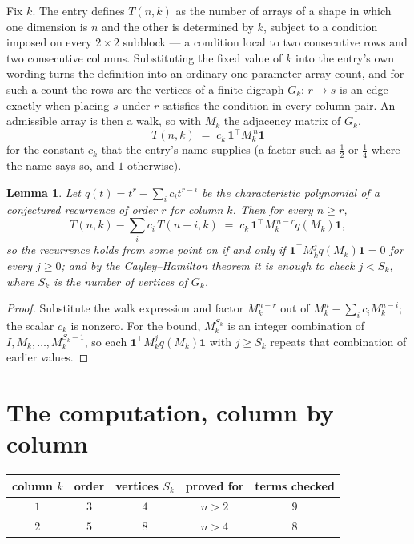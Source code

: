\documentclass[11pt,a4paper]{article}
\theoremstyle{plain}
\newtheorem{lemma}[theorem]{Lemma}
\theoremstyle{definition}
\begin{document}
Fix $k$. The entry defines $T(n,k)$ as the number of arrays of a shape in which one dimension
is $n$ and the other is determined by $k$, subject to a condition imposed on every
$2\times2$ subblock --- a condition local to two consecutive rows and two consecutive columns.
Substituting the fixed value of $k$ into the entry's own wording turns the definition into an
ordinary one-parameter array count, and for such a count the rows are the vertices of a finite
digraph $G_k$: $r\to s$ is an edge exactly when placing $s$ under $r$ satisfies the condition
in every column pair. An admissible array is then a walk, so with $M_k$ the adjacency matrix
of $G_k$,
\[
T(n,k)\;=\;c_k\,\mathbf{1}^{\!\top}M_k^{\,n}\mathbf{1}
\]
for the constant $c_k$ that the entry's name supplies (a factor such as $\tfrac12$ or
$\tfrac14$ where the name says so, and $1$ otherwise).

\begin{lemma}\label{lem:crit}
Let $q(t)=t^{r}-\sum_i c_it^{r-i}$ be the characteristic polynomial of a conjectured
recurrence of order $r$ for column $k$. Then for every $n\ge r$,
\[
T(n,k)-\sum_i c_i\,T(n-i,k)\;=\;c_k\,\mathbf{1}^{\!\top}M_k^{\,n-r}q(M_k)\mathbf{1},
\]
so the recurrence holds from some point on if and only if
$\mathbf{1}^{\!\top}M_k^{j}q(M_k)\mathbf{1}=0$ for every $j\ge0$; and by the
Cayley--Hamilton theorem it is enough to check $j<S_k$, where $S_k$ is the number of vertices
of $G_k$.
\end{lemma}

\begin{proof}
Substitute the walk expression and factor $M_k^{n-r}$ out of $M_k^{n}-\sum_ic_iM_k^{n-i}$;
the scalar $c_k$ is nonzero. For the bound, $M_k^{S_k}$ is an integer combination of
$I,M_k,\dots,M_k^{S_k-1}$, so each $\mathbf{1}^{\!\top}M_k^{j}q(M_k)\mathbf{1}$ with
$j\ge S_k$ repeats that combination of earlier values.
\end{proof}

\section{The computation, column by column}

\begin{center}
\begin{tabular}{ccccc}
column $k$ & order & vertices $S_k$ & proved for & terms checked \\ \hline
$1$ & $3$ & $4$ & $n>2$ & $9$ \\
$2$ & $5$ & $8$ & $n>4$ & $8$ \\
\end{tabular}
\end{center}
\end{document}
